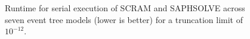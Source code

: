 \begin{figure}[]
  \centering
  
  \caption{Runtime for serial execution of SCRAM and SAPHSOLVE across seven event tree models (lower is better) for a truncation limit of $10^{-12}$.}
  \label{fig:execution_runtime}
\end{figure}